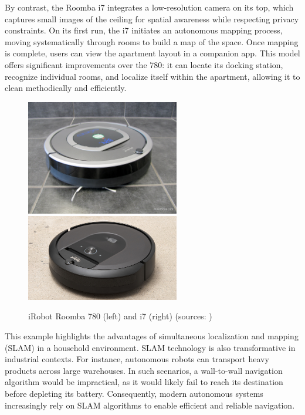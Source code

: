 By contrast, the Roomba i7 integrates a low-resolution camera on its top, which captures small images of the ceiling for spatial awareness while respecting privacy constraints. On its first run, the i7 initiates an autonomous mapping process, moving systematically through rooms to build a map of the space. Once mapping is complete, users can view the apartment layout in a companion app. This model offers significant improvements over the 780: it can locate its docking station, recognize individual rooms, and localize itself within the apartment, allowing it to clean methodically and efficiently.
\FloatBarrier
\begin{figure}[htbp]
	\centering
	\includegraphics[width=67mm, keepaspectratio]{figures/iRobot_roomba_780.jpg}\hspace{1cm}
	\includegraphics[width=67mm, keepaspectratio]{figures/iRobot_roomba_i7.jpg}\\\vspace{5mm}
	\caption{iRobot Roomba 780 (left) and i7 (right) (sources: \cite{roomba780}\cite{roombai7})}
	\label{fig:Roombas}
\end{figure}
\FloatBarrier
This example highlights the advantages of simultaneous localization and mapping (SLAM) in a household environment. SLAM technology is also transformative in industrial contexts. For instance, autonomous robots can transport heavy products across large warehouses. In such scenarios, a wall-to-wall navigation algorithm would be impractical, as it would likely fail to reach its destination before depleting its battery. Consequently, modern autonomous systems increasingly rely on SLAM algorithms to enable efficient and reliable navigation.

